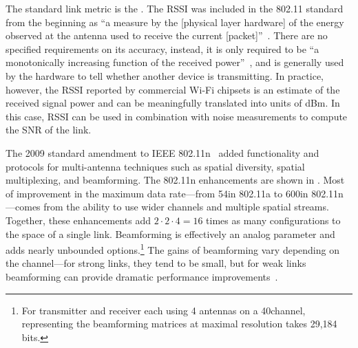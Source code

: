 The standard link metric is the . The RSSI was included in the 802.11 standard from the beginning as ``a measure by the [physical layer hardware] of the energy observed at the antenna used to receive the current [packet]''~\cite[\S 17.2.3.2]{80211}. There are no specified requirements on its accuracy, instead, it is only required to be ``a monotonically increasing function of the received power''~\cite[\S 17.2.3.2]{80211}, and is generally used by the hardware to tell whether another device is transmitting. In practice, however, the RSSI reported by commercial Wi-Fi chipsets is an estimate of the received signal power and can be meaningfully translated into units of dBm. In this case, RSSI can be used in combination with noise measurements to compute the SNR of the link.

The 2009 standard amendment to IEEE 802.11n~\cite{80211n} added functionality and protocols for multi-antenna techniques such as spatial diversity, spatial multiplexing, and beamforming. The 802.11n enhancements are shown in . Most of improvement in the maximum data rate---from 54\Mbps in 802.11a to 600\Mbps in 802.11n---comes from the ability to use wider channels and multiple spatial streams. Together, these enhancements add $2\cdot2\cdot4=16$ times as many configurations to the space of a single link. Beamforming is effectively an analog parameter and adds nearly unbounded options.\footnote{For transmitter and receiver each using 4 antennas on a 40\MHz channel, representing the beamforming matrices at maximal resolution takes 29,184 bits.} The gains of beamforming vary depending on the channel---for strong links, they tend to be small, but for weak links beamforming can provide dramatic performance improvements~\cite{Atheros_11nTechPaper}.

